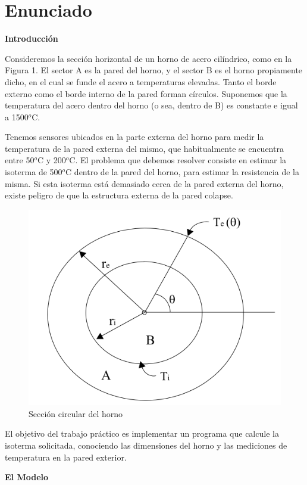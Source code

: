 \newpage
\section{Enunciado} \label{sec:enunciado}

{\bf Introducción}

Consideremos la secci\'on horizontal de un horno de acero cil\'indrico, como en la Figura 1. El sector A es la pared del horno, y el sector B es el horno propiamente dicho, en el cual se funde el acero a temperaturas elevadas. Tanto el borde externo como el borde interno de la pared forman c\'irculos. Suponemos que la temperatura del acero dentro del horno (o sea, dentro de B) es constante e igual a 1500$^{o}$C.

\medskip

Tenemos sensores ubicados en la parte externa del horno para medir la temperatura de la pared externa del mismo, que habitualmente se encuentra entre 50$^{o}$C y 200$^{o}$C. El problema que debemos resolver consiste en estimar la isoterma de 500$^{o}$C dentro de la pared del horno, para estimar la resistencia de la misma. Si esta isoterma est\'a demasiado cerca de la pared externa del horno, existe peligro de que la estructura externa de la pared colapse.


\begin{figure}[ht]
\begin{center}
\includegraphics[width=0.6\columnwidth]{imagenes/horno.png}
\caption{Secci\'on circular del horno}
\end{center}
\end{figure}



El objetivo del trabajo práctico es implementar un programa que calcule la isoterma solicitada, conociendo las dimensiones del horno y las mediciones de temperatura en la pared exterior.

{\bf El Modelo}

